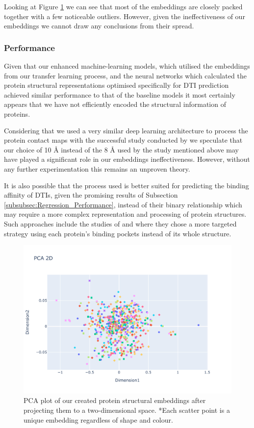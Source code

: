 Looking at Figure \ref{fig:Embeddings_PCA} we can see that most of the embeddings are closely packed together with a few noticeable outliers. However, given the ineffectiveness of our embeddings we cannot draw any conclusions from their spread.

\subsubsection{Performance}

Given that our enhanced machine-learning models, which utilised the embeddings from our transfer learning process, and the neural networks which calculated the protein structural representations optimised specifically for DTI prediction achieved similar performance to that of the baseline models it most certainly appears that we have not efficiently encoded the structural information of proteins.

Considering that we used a very similar deep learning architecture to process the protein contact maps with the successful study conducted by \citet{Jiang2020} we speculate that our choice of 10 \AA {} instead of the 8 \AA {} used by the study mentioned above may have played a significant role in our embeddings ineffectiveness. However, without any further experimentation this remains an unproven theory.

It is also possible that the process used is better suited for predicting the binding affinity of DTIs, given the promising results of Subsection \ref{subsubsec:Regression_Performance}, instead of their binary relationship which may require a more complex representation and processing of protein structures. Such approaches include the studies of \citet{Sofia} and \citet{Lee2022} where they chose a more targeted strategy using each protein's binding pockets instead of its whole structure.

\begin{figure}[!hb]
    \centering
    \includegraphics[width=1.0\linewidth]{images/Embeddings_PCA.pdf}    
    \caption{PCA plot of our created protein structural embeddings after projecting them to a two-dimensional space. *Each scatter point is a unique embedding regardless of shape and colour.}
    \label{fig:Embeddings_PCA} 
\end{figure}

